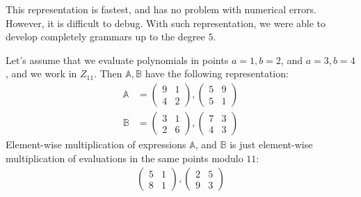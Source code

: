 This representation is fastest, and has no problem with numerical errors. However, it is difficult to debug. With such representation, we were able to
develop completely grammars up to the degree $5$.


Let's assume that we evaluate polynomials in points $a = 1, b = 2$, and $a = 3, b = 4$, and we work in $Z_{11}$.
Then $\mathbb{A}, \mathbb{B}$ have the following representation:
\begin{align*}
\mathbb{A} &= \begin{pmatrix} 9 & 1\\ 4 & 2 \end{pmatrix}, \begin{pmatrix} 5 & 9\\ 5 & 1 \end{pmatrix} \\
\mathbb{B} &= \begin{pmatrix} 3 & 1\\ 2 & 6 \end{pmatrix}, \begin{pmatrix} 7 & 3\\ 4 & 3 \end{pmatrix}
\end{align*}
Element-wise multiplication of expressions $\mathbb{A}$, and $\mathbb{B}$ is just element-wise multiplication of evaluations
in the same points modulo $11$:
\begin{align*}
\begin{pmatrix} 5 & 1\\ 8 & 1 \end{pmatrix}, \begin{pmatrix} 2 & 5\\ 9 & 3 \end{pmatrix}
\end{align*}

